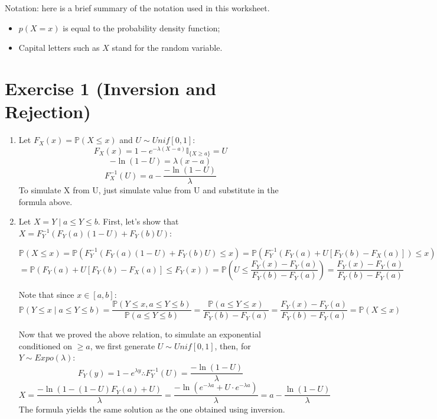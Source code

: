 \documentclass[12pt,letterpaper]{article}
\begin{document}
Notation: here is a brief summary of the notation used in this worksheet.
\begin{itemize}
\item $ p(X=x)$ is equal to the probability density function;
\item Capital letters such as $X$ stand for the random variable.
\end{itemize}

\section*{Exercise 1 (Inversion and Rejection)}
\begin{enumerate}[leftmargin=!,labelindent=5pt]
    \item Let $ F_X(x) = \mathbb{P}(X \leq x) $ and $U \sim Unif[0,1]$:
            $$ F_X(x) = 1 - e^{-\lambda(X-a)}\mathbb{I}_{\{X \geq a\}}=U $$
            $$ -\ln(1-U) = \lambda(x-a) $$
            $$ F_X^{-1}(U) = a - \frac{-\ln(1-U)}{\lambda} $$
    To simulate X from U, just simulate value from U and substitute in the
    formula above.
        
    \item Let $X = Y \mid a \leq Y \leq b$.
    First, let's show that $X = F_Y^{-1}(F_Y(a)(1-U)+F_Y(b)U)$:

    $$\mathbb{P}(X \leq x) = \mathbb{P}(F_Y^{-1}(F_Y(a)(1-U)+F_Y(b)U)\leq x)
    = \mathbb{P}(F_Y^{-1}(F_Y(a)+U[F_Y(b)-F_X(a)])\leq x)$$
    $$ = \mathbb{P}(F_Y(a)+U[F_Y(b)-F_X(a)]\leq F_Y(x)) = 
    \mathbb{P}\left(U \leq \frac{F_Y(x) - F_Y(a)}{F_Y(b)-F_Y(a)}\right)
    =\frac{F_Y(x) - F_Y(a)}{F_Y(b)-F_Y(a)}$$

    Note that since $x \in [a,b]$: 
    $$\mathbb{P}(Y \leq x \mid a \leq Y \leq b)
    = \frac{\mathbb{P}(Y \leq x, a \leq Y \leq b)}
    {\mathbb{P}(a \leq Y \leq b)}
    =\frac{\mathbb{P}(a \leq Y \leq x)}{F_Y(b) - F_Y(a)}
    =\frac{F_Y(x) - F_Y(a)}{F_Y(b)-F_Y(a)} = \mathbb{P}(X \leq x)$$

    Now that we proved the above relation, to simulate an exponential
    conditioned on $\geq a$, we first generate $U \sim Unif[0,1]$, then,
    for $Y \sim Expo(\lambda)$:
    $$F_Y(y) = 1 - e^{\lambda y} \therefore F_Y^{-1}(U)
    = \frac{-\ln(1-U)}{\lambda}$$
    $$X = \frac{-\ln(1 - (1-U)F_Y(a)+U)}{\lambda} = 
    \frac{-\ln(e^{-\lambda a}+U\cdot e^{-\lambda a})}{\lambda}
    = a - \frac{\ln(1-U)}{\lambda}
    $$
    The formula yields the same solution as the one obtained using
    inversion.


\end{enumerate}
\end{document}

